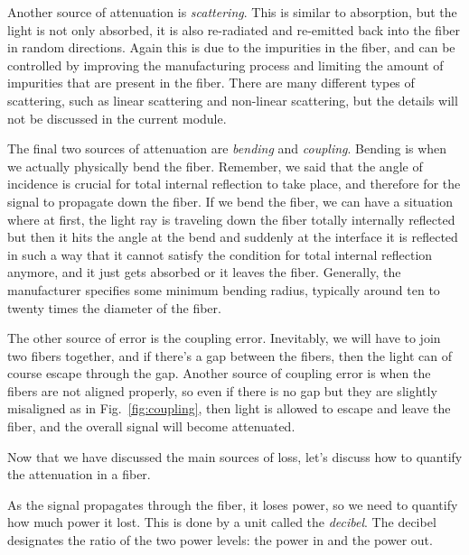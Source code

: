 Another source of attenuation is \emph{scattering}. This is similar to absorption, but the light is not only absorbed, it is also re-radiated and re-emitted back into the fiber in random directions. Again this is due to the impurities in the fiber, and can be controlled by improving the manufacturing process and limiting the amount of impurities that are present in the fiber. There are many different types of scattering, such as linear scattering and non-linear scattering, but the details will not be discussed in the current module.

The final two sources of attenuation are \emph{bending} and \emph{coupling}. Bending is when we actually physically bend the fiber. Remember, we said that the angle of incidence is crucial for total internal reflection to take place, and therefore for the signal to propagate down the fiber. If we bend the fiber, we can have a situation where at first, the light ray is traveling down the fiber totally internally reflected but then it hits the angle at the bend and suddenly at the interface it is reflected in such a way that it cannot satisfy the condition for total internal reflection anymore, and it just gets absorbed or it leaves the fiber.  Generally, the manufacturer specifies some minimum bending radius, typically around ten to twenty times the diameter of the fiber.

The other source of error is the coupling error. Inevitably, we will have to join two fibers together, and if there's a gap between the fibers, then the light can of course escape through the gap. Another source of coupling error is when the fibers are not aligned properly, so even if there is no gap but they are slightly misaligned as in Fig.~\ref{fig:coupling}, then light is allowed to escape and leave the fiber, and the overall signal will become attenuated.

Now that we have discussed the main sources of loss, let's discuss how to quantify the attenuation in a fiber.

As the signal propagates through the fiber, it loses power, so we need to quantify how much power it lost. This is done by a unit called the \emph{decibel}. The decibel designates the ratio of the two power levels: the power in and the power out.

